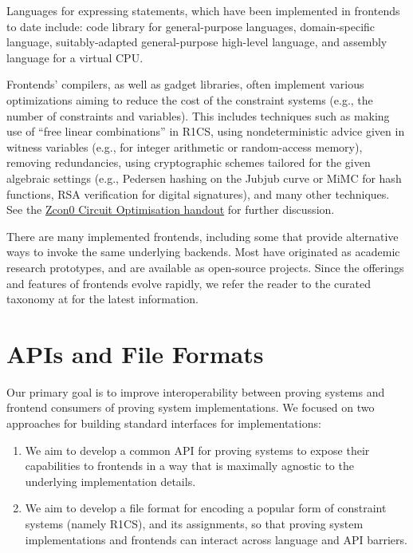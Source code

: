 Languages for expressing statements, which have been implemented in frontends to date include: code library for general-purpose languages, domain-specific language, suitably-adapted general-purpose high-level language, and assembly language for a virtual CPU.

Frontends’ compilers, as well as gadget libraries, often implement various optimizations aiming to reduce the cost of the constraint systems (e.g., the number of constraints and variables). This includes techniques such as making use of “free linear combinations” in R1CS, using nondeterministic advice given in witness variables (e.g., for integer arithmetic or random-access memory), removing redundancies, using cryptographic schemes tailored for the given algebraic settings (e.g., Pedersen hashing on the Jubjub curve or MiMC for hash functions, RSA verification for digital signatures), and many other techniques. See the \href{https://docs.google.com/document/d/1aZ1GUAJOBFuqD4GOo9HqAH8w4xJo7HM4Bjte5-wkdnU/edit?usp=sharing}{Zcon0 Circuit Optimisation handout} for further discussion.

There are many implemented frontends, including some that provide alternative ways to invoke the same underlying backends. Most have originated as academic research prototypes, and are available as open-source projects. Since the offerings and features of frontends evolve rapidly, we refer the reader to the curated taxonomy at  for the latest information.


\section{APIs and File Formats}
\label{implem:apis-and-file-formats}

Our primary goal is to improve interoperability between proving systems and frontend consumers of proving system implementations. We focused on two approaches for building standard interfaces for implementations:

\begin{enumerate}
\item We aim to develop a common API for proving systems to expose their capabilities to frontends in a way that is maximally agnostic to the underlying implementation details.
\item We aim to develop a file format for encoding a popular form of constraint systems (namely R1CS), and its assignments, so that proving system implementations and frontends can interact across language and API barriers.
\end{enumerate}

